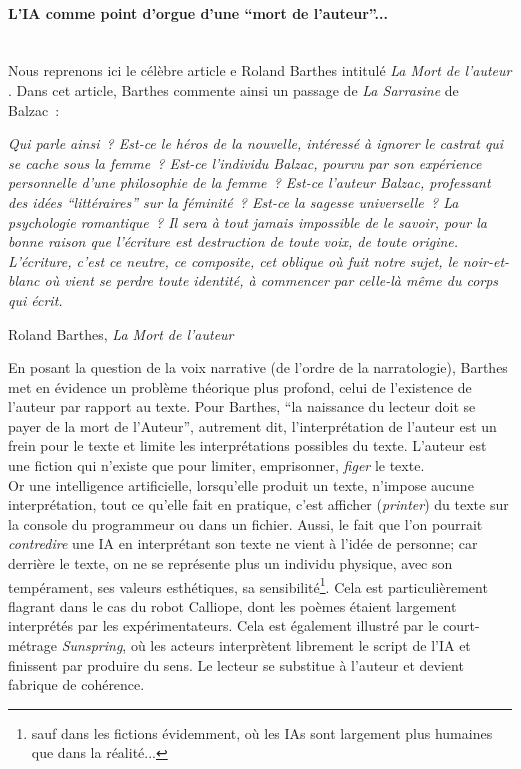 \documentclass{article}
\newcommand{\subsubsubsection}[1]{\paragraph{#1}\mbox{}\\}
\newenvironment{citationbox}
{\begin{center}
		\begin{minipage}{.8\textwidth}
		}
		{
		\end{minipage}	
\end{center}
}
\begin{document}
				\subsubsubsection{L'IA comme point d'orgue d'une ``mort de l'auteur''...}
					Nous reprenons ici le célèbre article e Roland Barthes intitulé \textit{La Mort de l'auteur} \cite{barthes1968}. Dans cet article, Barthes commente ainsi un passage de \textit{La Sarrasine} de Balzac~:
					\begin{citationbox}
						\textit{Qui parle ainsi~? Est-ce
						le héros de la nouvelle, intéressé à ignorer le castrat qui se cache sous la femme~? Est-ce l'individu
						Balzac, pourvu par son expérience personnelle d'une philosophie de la femme~? Est-ce l'auteur
						Balzac, professant des idées ``littéraires'' sur la féminité~? Est-ce la sagesse universelle~? La psychologie romantique~? Il sera à tout jamais impossible de le savoir, pour la bonne raison que l'écriture est destruction de toute voix, de toute origine. L'écriture, c'est ce neutre, ce composite, cet
						oblique où fuit notre sujet, le noir-et-blanc où vient se perdre toute identité, à commencer par
						celle-là même du corps qui écrit.}
						\begin{flushright}
							Roland Barthes, \textit{La Mort de l'auteur} \cite{barthes1968}
						\end{flushright}
					\end{citationbox}
					En posant la question de la voix narrative (de l'ordre de la narratologie), Barthes met en évidence un problème théorique plus profond, celui de l'existence de l'auteur par rapport au texte. Pour Barthes, ``la naissance du lecteur doit se payer de la mort de l'Auteur'', autrement dit, l'interprétation de l'auteur est un frein pour le texte et limite les interprétations possibles du texte. L'auteur est une fiction qui n'existe que pour limiter, emprisonner, \textit{figer} le texte.\\
					Or une intelligence artificielle, lorsqu'elle produit un texte, n'impose aucune interprétation, tout ce qu'elle fait en pratique, c'est afficher (\textit{printer}) du texte sur la console du programmeur ou dans un fichier. Aussi, le fait que l'on pourrait \textit{contredire} une IA en interprétant son texte ne vient à l'idée de personne; car derrière le texte, on ne se représente plus un individu physique, avec son tempérament, ses valeurs esthétiques, sa sensibilité\footnote{sauf dans les fictions évidemment, où les IAs sont largement plus humaines que dans la réalité...}. Cela est particulièrement flagrant dans le cas du robot Calliope, dont les poèmes étaient largement interprétés par les expérimentateurs. Cela est également illustré par le court-métrage \textit{Sunspring}, où les acteurs interprètent librement le script de l'IA et finissent par produire du sens. Le lecteur se substitue à l'auteur et devient fabrique de cohérence.\\
					
\end{document}
